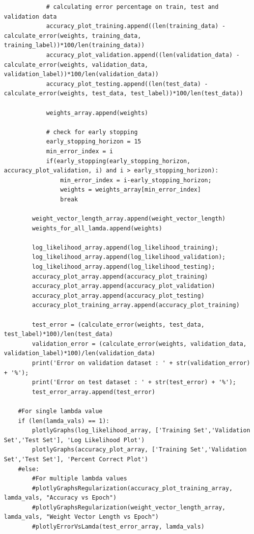 \documentclass{article}
\begin{document}
\begin{lstlisting}
            # calculating error percentage on train, test and validation data
            accuracy_plot_training.append((len(training_data) - calculate_error(weights, training_data, training_label))*100/len(training_data))
            accuracy_plot_validation.append((len(validation_data) - calculate_error(weights, validation_data, validation_label))*100/len(validation_data))
            accuracy_plot_testing.append((len(test_data) - calculate_error(weights, test_data, test_label))*100/len(test_data))

            weights_array.append(weights)        

            # check for early stopping
            early_stopping_horizon = 15
            min_error_index = i
            if(early_stopping(early_stopping_horizon, accuracy_plot_validation, i) and i > early_stopping_horizon):
                min_error_index = i-early_stopping_horizon;
                weights = weights_array[min_error_index]
                break
           
        weight_vector_length_array.append(weight_vector_length)
        weights_for_all_lamda.append(weights)
        
        log_likelihood_array.append(log_likelihood_training);
        log_likelihood_array.append(log_likelihood_validation);
        log_likelihood_array.append(log_likelihood_testing);
        accuracy_plot_array.append(accuracy_plot_training)
        accuracy_plot_array.append(accuracy_plot_validation)
        accuracy_plot_array.append(accuracy_plot_testing)  
        accuracy_plot_training_array.append(accuracy_plot_training)
        
        test_error = (calculate_error(weights, test_data, test_label)*100)/len(test_data)
        validation_error = (calculate_error(weights, validation_data, validation_label)*100)/len(validation_data)
        print('Error on validation dataset : ' + str(validation_error) + '%');
        print('Error on test dataset : ' + str(test_error) + '%');
        test_error_array.append(test_error)
    
    #For single lambda value
    if (len(lamda_vals) == 1):
        plotlyGraphs(log_likelihood_array, ['Training Set','Validation Set','Test Set'], 'Log Likelihood Plot')    
        plotlyGraphs(accuracy_plot_array, ['Training Set','Validation Set','Test Set'], 'Percent Correct Plot')    
    #else:
        #For multiple lambda values
        #plotlyGraphsRegularization(accuracy_plot_training_array, lamda_vals, "Accuracy vs Epoch")
        #plotlyGraphsRegularization(weight_vector_length_array, lamda_vals, "Weight Vector Length vs Epoch")
        #plotlyErrorVsLamda(test_error_array, lamda_vals)
    

\end{lstlisting}
\end{document}
